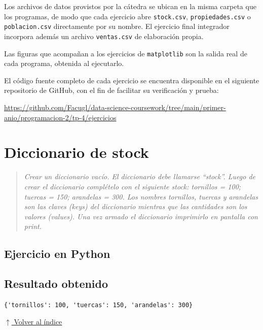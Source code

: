 \documentclass[12pt]{article}
\newcommand{\codigopython}[2]{%
}
\newcommand{\volverindice}{%
    \vspace{1em}%
    \begin{flushright}%
        \hyperlink{indice}{\small $\uparrow$ Volver al índice}%
    \end{flushright}%
}
\newcommand{\enunciado}[1]{%
    \begin{quote}
        \itshape #1
    \end{quote}
}
\begin{document}
Los archivos de datos provistos por la cátedra se ubican en la misma carpeta que los programas, de modo que cada ejercicio abre \texttt{stock.csv}, \texttt{propiedades.csv} o \texttt{poblacion.csv} directamente por su nombre. El ejercicio final integrador incorpora además un archivo \texttt{ventas.csv} de elaboración propia.

Las figuras que acompañan a los ejercicios de \texttt{matplotlib} son la salida real de cada programa, obtenida al ejecutarlo.

El código fuente completo de cada ejercicio se encuentra disponible en el siguiente repositorio de GitHub, con el fin de facilitar su verificación y prueba:

\begin{center}
    \url{https://github.com/Facugl/data-science-coursework/tree/main/primer-anio/programacion-2/tp-4/ejercicios}
\end{center}


\newpage
\section{Diccionario de stock}

\enunciado{Crear un diccionario vacío. El diccionario debe llamarse \enquote{stock}. Luego de crear el diccionario complételo con el siguiente stock: tornillos = 100; tuercas = 150; arandelas = 300. Los nombres tornillos, tuercas y arandelas son las claves (keys) del diccionario mientras que las cantidades son los valores (values). Una vez armado el diccionario imprimirlo en pantalla con print.}

\subsection*{Ejercicio en Python}

\codigopython{01}{Diccionario de stock}

\subsection*{Resultado obtenido}

\begin{lstlisting}[style=salida]
{'tornillos': 100, 'tuercas': 150, 'arandelas': 300}
\end{lstlisting}

\volverindice
\newpage
\end{document}

